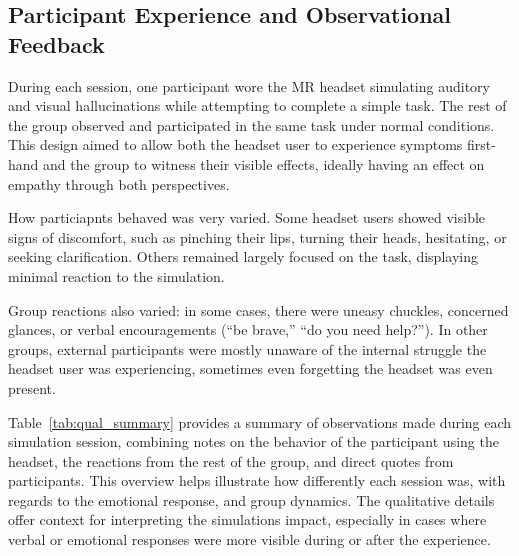 \subsection{Participant Experience and Observational Feedback}

During each session, one participant wore the MR headset simulating auditory and visual hallucinations while attempting to complete a simple task. The rest of the group observed and participated in the same task under normal conditions. This design aimed to allow both the headset user to experience symptoms first-hand and the group to witness their visible effects, ideally having an effect on empathy through both perspectives.

\vspace{1em}

How particiapnts behaved was very varied. Some headset users showed visible signs of discomfort, such as pinching their lips, turning their heads, hesitating, or seeking clarification. Others remained largely focused on the task, displaying minimal reaction to the simulation.

\vspace{1em}

Group reactions also varied: in some cases, there were uneasy chuckles, concerned glances, or verbal encouragements (“be brave,” “do you need help?”). In other groups, external participants were mostly unaware of the internal struggle the headset user was experiencing, sometimes even forgetting the headset was even present.

\vspace{1em}

Table~\ref{tab:qual_summary} provides a summary of observations made during each simulation session, combining notes on the behavior of the participant using the headset, the reactions from the rest of the group, and direct quotes from participants. This overview helps illustrate how differently each session was, with regards to the emotional response, and group dynamics. The qualitative details offer context for interpreting the simulations impact, especially in cases where verbal or emotional responses were more visible during or after the experience.

